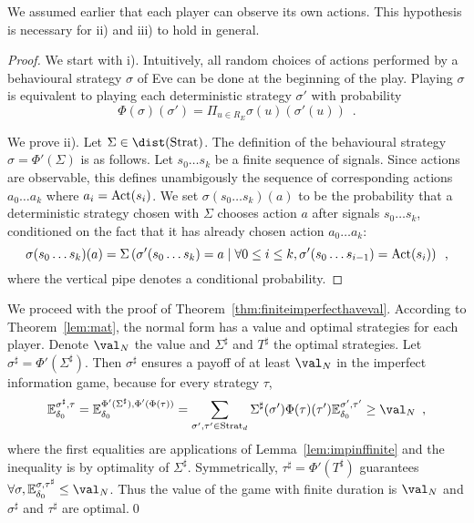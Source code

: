 We assumed earlier that each player can observe
its own actions. This hypothesis is necessary for ii) and iii)
to hold in general.

\begin{proof}
We start with i).
Intuitively,
all random choices of actions performed by
a behavioural strategy $\sigma$ of Eve can be done at the beginning of the play.
Playing $\sigma$ 
is equivalent to playing each deterministic strategy $\sigma'$ 
with probability
\[
\Phi(\sigma)(\sigma') = 
\Pi_{u \in R_E} \sigma(u)(\sigma'(u))\enspace.
\]

We prove ii).
Let $\Sigma\in\dist(\Strat)$. The definition of the behavioural strategy
$\sigma=\Phi'(\Sigma)$ is as follows.
Let $s_0\ldots s_k$ be a finite sequence of signals.
Since actions are observable, this defines unambigously
the sequence of corresponding actions $a_0\ldots a_k$
where $a_i = \text{Act}(s_i)$.
We set $\sigma(s_0\ldots s_k)(a)$ to be the probability that a 
deterministic strategy
chosen with $\Sigma$ chooses action $a$ after signals
$s_0\ldots s_k$, conditioned on the fact that it has already
chosen action $a_0\ldots a_k$:
\[
\sigma(s_0\ldots s_k)(a) 
=
\Sigma\left(\sigma'(s_0\ldots s_k)=a \mid \forall 0\leq i \leq k,
 \sigma'(s_0\ldots s_{i-1})=\text{Act}(s_i)\right)\enspace,
\]
where the vertical pipe denotes a conditional probability.
\end{proof}

We proceed with the proof of  Theorem~\ref{thm:finiteimperfecthaveval}.
According to Theorem~\ref{lem:mat},
the normal form has a value and optimal strategies
for each player. 
Denote $\val_N$ the value
and $\Sigma^\sharp$ and $T^\sharp$ the optimal strategies.
Let $\sigma^\sharp=\Phi'(\Sigma^\sharp)$.
Then $\sigma^\sharp$ ensures a payoff
of at least $\val_N$ in the imperfect information game,
because for every strategy $\tau$,
\[
\mathbb{E}_{\ini}^{\sigma^\sharp,\tau}
=
\mathbb{E}_{\ini}^{\Phi'(\Sigma^\sharp),\Phi'(\Phi(\tau))}
=
\sum_{\sigma',\tau' \in \Strat_d}\Sigma^\sharp(\sigma') \Phi(\tau)(\tau')
\mathbb{E}_{\ini}^{\sigma',\tau'}
\geq \val_N\enspace,
\]
where the first equalities are applications of 
Lemma~\ref{lem:impinffinite}
and the inequality is by optimality of $\Sigma^\sharp$.
Symmetrically, 
$\tau^\sharp=\Phi'(T^\sharp)$ guarantees 
$\forall \sigma,\mathbb{E}_{\ini}^{\sigma,\tau^\sharp}\leq\val_N$. 
Thus the value of the game with finite duration
is $\val_N$ and $\sigma^\sharp$
and $\tau^\sharp$ are optimal.\qed

